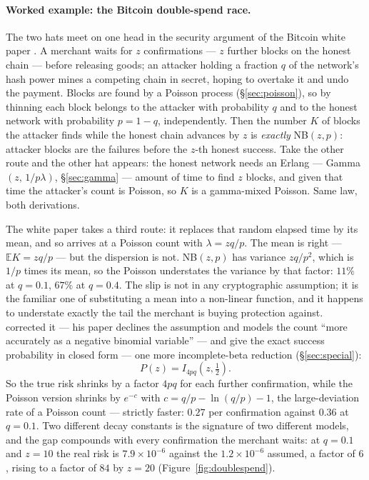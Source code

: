 \documentclass[11pt]{article}
\numberwithin{equation}{section}
\newcommand{\E}{\mathbb{E}}
\begin{document}
\paragraph{Worked example: the Bitcoin double-spend race.}\label{par:doublespend}
The two hats meet on one head in the security argument of the Bitcoin
white paper \citep{nakamoto2008}.  A merchant waits for $z$
confirmations --- $z$ further blocks on the honest chain --- before
releasing goods; an attacker holding a fraction $q$ of the network's
hash power mines a competing chain in secret, hoping to overtake it and
undo the payment.  Blocks are found by a Poisson process
(\S\ref{sec:poisson}), so by thinning each block belongs to the
attacker with probability $q$ and to the honest network with
probability $p=1-q$, independently.  Then the number $K$ of blocks the
attacker finds while the honest chain advances by $z$ is
\emph{exactly} NB$(z,p)$: attacker blocks are the failures before the
$z$-th honest success.  Take the other route and the other hat
appears: the honest network needs an Erlang --- Gamma$(z,\,1/p\lambda)$,
\S\ref{sec:gamma} --- amount of time to find $z$ blocks, and given that
time the attacker's count is Poisson, so $K$ is a gamma-mixed Poisson.
Same law, both derivations.

The white paper takes a third route: it replaces that random elapsed
time by its mean, and so arrives at a Poisson count with
$\lambda=zq/p$.  The mean is right --- $\E K=zq/p$ --- but the
dispersion is not.  NB$(z,p)$ has variance $zq/p^2$, which is $1/p$
times its mean, so the Poisson understates the variance by that factor:
$11\%$ at $q=0.1$, $67\%$ at $q=0.4$.  The slip is not in any
cryptographic assumption; it is the familiar one of substituting a mean
into a non-linear function, and it happens to understate exactly the
tail the merchant is buying protection against.  \citet{rosenfeld2014} corrected it --- his
paper declines the assumption and models the count ``more accurately as
a negative binomial variable'' --- and \citet{grunspan2018} give the
exact success probability in closed form --- one more incomplete-beta reduction
(\S\ref{sec:special}):
\[
P(z)=I_{4pq}\!\left(z,\tfrac12\right).
\]
So the true risk shrinks by a factor $4pq$ for each further
confirmation, while the Poisson version shrinks by $e^{-c}$ with
$c=q/p-\ln(q/p)-1$, the large-deviation rate of a Poisson count ---
strictly faster: $0.27$ per confirmation against $0.36$ at $q=0.1$.
Two different decay constants is the
signature of two different models, and the gap compounds with every
confirmation the merchant waits: at $q=0.1$ and $z=10$ the real risk is
$7.9\times10^{-6}$ against the $1.2\times10^{-6}$ assumed, a factor of
$6$, rising to a factor of $84$ by $z=20$ (Figure~\ref{fig:doublespend}).
\end{document}
